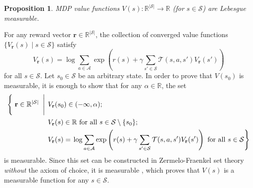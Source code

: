 \documentclass{article}
\newtheorem{proposition}[theorem]{Proposition}
\newenvironment{proofsketch}{%
  \renewcommand{\proofname}{Proof sketch}\proof}{\endproof}
\theoremstyle{definition}
\theoremstyle{remark}
\newcommand{\V}{V_{\mathbf{r}}}
\begin{document}
\begin{proposition} \label{thm:measurability}
  MDP value functions $V(s) : \mathbb{R}^{|\mathcal{S}|} \to \mathbb{R}$ (for $s
  \in \mathcal{S}$) are Lebesgue measurable.
\end{proposition}
\begin{proofsketch}
  For any reward vector $\mathbf{r} \in \mathbb{R}^{|\mathcal{S}|}$, the
  collection of converged value functions $\{ \V(s) \mid s \in
  \mathcal{S} \}$ satisfy
  \[
    \V(s) = \log \sum_{a \in \mathcal{A}}
    \exp\left( r(s) + \gamma\sum_{s' \in \mathcal{S}} \mathcal{T}(s, a,
      s')\V(s') \right)
  \]
  for all $s \in \mathcal{S}$. Let $s_0 \in \mathcal{S}$ be an arbitrary state.
  In order to prove that $V(s_0)$ is measurable, it is enough to show that for
  any $\alpha \in \mathbb{R}$, the set
  \[
    \begin{split}
      \left\{ \vphantom{\sum_{a \in \mathcal{A}}} \right. \mathbf{r} \in
      \mathbb{R}^{|\mathcal{S}|} \left. \vphantom{\sum_{a \in \mathcal{A}}} \;
        \middle| \; \right. &\V(s_0) \in (-\infty, \alpha); \\
      &\V(s) \in
      \mathbb{R} \text{ for all } s \in \mathcal{S} \setminus \{ s_0 \}; \\
      &\V(s) = \left. \log \sum_{a \in \mathcal{A}} \exp\left( r(s)
          + \gamma\sum_{s' \in \mathcal{S}} \mathcal{T}(s, a,
          s')\V(s') \right) \text{ for all } s \in
        \mathcal{S}\right\}
    \end{split}
  \]
  is measurable. Since this set can be constructed in Zermelo-Fraenkel set
  theory \emph{without} the axiom of choice, it is measurable
  \cite{herrlich2006axiom}, which proves that $V(s)$ is a measurable function
  for any $s \in \mathcal{S}$.
\end{proofsketch}
\end{document}

